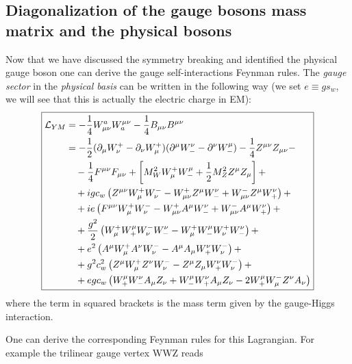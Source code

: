 \documentclass[TheoreticalPhy_ModB.tex]{subfiles}
\begin{document}
\subsection{Diagonalization of the gauge bosons mass matrix and the physical bosons}

Now that we have discussed the symmetry breaking and identified the physical gauge boson one can derive the gauge self-interactions Feynman rules.
The \emph{gauge sector} in the \emph{physical basis} can be written in the following way (we set $e\equiv gs_w$, we will see that this is actually the electric charge in EM):
\[\boxed{\begin{aligned}
\mathcal L_{YM}
&=-\frac14W_{\mu\nu}^aW_a^{\mu\nu}-\frac14B_{\mu\nu} B^{\mu\nu}\\
&=-\frac12(\partial_{\mu} W_\nu^+-\partial_{\nu} W_\mu^+)(\partial^{\mu} W_-^\nu-\partial^{\nu} W_-^\mu)-\frac14Z^{\mu\nu} Z_{\mu\nu}-\\
&\quad-\frac14F^{\mu\nu} F_{\mu\nu}+\left[M^2_WW_\mu^+W_-^\mu+\frac12 M_Z^2Z^\mu Z_\mu\right]+\\
&\quad+igc_w\left(Z^{\mu\nu} W_\mu^+W_\nu^--W_{\mu\nu}^+Z^\mu W_-^\nu+W_{\mu\nu}^-Z^\mu W_+^\nu\right)+\\
&\quad+ie\left(F^{\mu\nu} W_\mu^+W_\nu^--W_{\mu\nu}^+A^\mu W^\nu_-+W_{\mu\nu}^-A^\mu W_+^\nu\right)+\\
&\quad+\frac{g^2}2\left(W_\mu^+W_+^\mu W^-_\nu W^\nu_--W_\mu^+W_-^\mu W_\nu^+W^\nu_-\right)+\\
&\quad+e^2\left(A^\mu W_\mu^+ A^\nu W_\nu^--A^\mu A_\mu W_+^\nu W_\nu^-\right)+\\
&\quad+g^2c_w^2\left(Z^\mu W_\mu^+ Z^\nu W_\nu^--Z^\mu Z_\mu W_+^\nu W_\nu^-\right)+\\
&\quad+egc_w\left(W_+^\mu W_-^\nu A_\mu Z_\nu+W_-^\mu W_+^\nu A_\mu Z_\nu-2W_+^\mu W_\mu^- Z^\nu A_\nu\right)
\end{aligned}}\]
where the term in squared brackets is the mass term given by the gauge-Higgs interaction.

One can derive the corresponding Feynman rules for this Lagrangian. For example the trilinear gauge vertex WWZ reads
\end{document}
